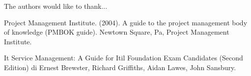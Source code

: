 \documentclass[conference]{IEEEtran}
\begin{document}
The authors would like to thank...






\begin{thebibliography}{1}

Project Management Institute. (2004). A guide to the project management body of knowledge (PMBOK guide). Newtown Square, Pa, Project Management Institute.

It Service Management: A Guide for Itil Foundation Exam Candidates (Second Edition) di Ernest Brewster, Richard Griffiths, Aidan Lawes, John Sansbury.


\end{thebibliography}




\end{document}
